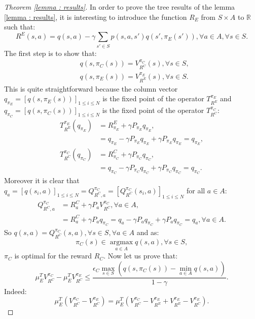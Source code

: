 \documentclass{llncs}
\newcommand{\argmax}{\operatorname*{argmax}}
\newcommand{\0}{\mathbf{0}}
\newcommand{\1}{\mathbf{1}}
\begin{document}
\begin{proof}[Theorem \ref{lemma : results}]
In order to prove the tree results of the lemma \ref{lemma : results}, it is interesting to introduce the function $R_E$ from $S\times A$ to $\mathbb{R}$ such that:
\begin{equation}
R^E(s,a)=q(s,a)-\gamma\sum_{s'\in S}p(s,a,s')q(s',\pi_E(s')), \forall a \in A, \forall s\in S.
\end{equation}
The first step is to show that:
\begin{align}
&q(s,\pi_C(s))=V^{\pi_C}_{R^C}(s), \forall s\in S,
\\
&q(s,\pi_E(s))=V^{\pi_E}_{R^E}(s), \forall s\in S.
\end{align}
This is quite straightforward because the column vector $q_{\pi_E}=[q(s,\pi_E(s))]_{1\leq i\leq N}$ is the fixed point of the operator $T^{\pi_E}_{R^E}$ and  $q_{\pi_C}=[q(s,\pi_C(s))]_{1\leq i\leq N}$ is the fixed point of the operator $T^{\pi_C}_{R^C}$:
\begin{align}
T^{\pi_E}_{R^E}(q_{\pi_E})&=R^E_{\pi_E}+\gamma P_{\pi_E}q_{\pi_E},
\\
&=q_{\pi_E}-\gamma P_{\pi_E}q_{\pi_E}+\gamma P_{\pi_E}q_{\pi_E}=q_{\pi_E},
\\
T^{\pi_C}_{R^C}(q_{\pi_C})&=R^C_{\pi_C}+\gamma P_{\pi_C}q_{\pi_C},
\\
&=q_{\pi_C}-\gamma P_{\pi_C}q_{\pi_C}+\gamma P_{\pi_C}q_{\pi_C}=q_{\pi_C}.
\end{align}
Moreover it is clear that $q_a=[q(s_i,a)]_{1\leq i\leq N}=Q^{\pi_C}_{R^C,a}=[Q^{\pi_C}_{R^C}(s_i,a)]_{1\leq i\leq N}$ for all $a \in A$:
\begin{align}
Q^{\pi_C}_{R^C,a}&=R^C_a+\gamma P_a V^{\pi_C}_{R^C}, \forall a\in A,
\\
&=R^C_a+\gamma P_a q_{\pi_C}=q_a-\gamma P_a q_{\pi_C} + \gamma P_a q_{\pi_C}=q_a, \forall a\in A.
\end{align}
So $q(s,a)=Q^{\pi_C}_{R^C}(s,a),\forall s\in S,\forall a\in A$ and as:
\begin{equation}
\pi_C(s)\in\argmax_{a\in A}q(s,a), \forall s\in S,
\end{equation}
$\pi_C$ is optimal for the reward $R_C$.
Now let us prove that:
\begin{equation}
\mu_E^TV^{\pi_C}_{R^C}-\mu_E^TV^{\pi_E}_{R^C}\leq\frac{\epsilon_C\max_{s\in S}(q(s,\pi_C(s))-\min_{a\in A}q(s,a))}{1-\gamma}.
\end{equation}
Indeed:
\begin{equation}
\mu_E^T(V^{\pi_C}_{R^C}-V^{\pi_E}_{R^C})=\mu_E^T(V^{\pi_C}_{R^C}-V^{\pi_E}_{R^E}+V^{\pi_E}_{R^E}-V^{\pi_E}_{R^C}).

\end{equation}
\end{proof}
\end{document}
